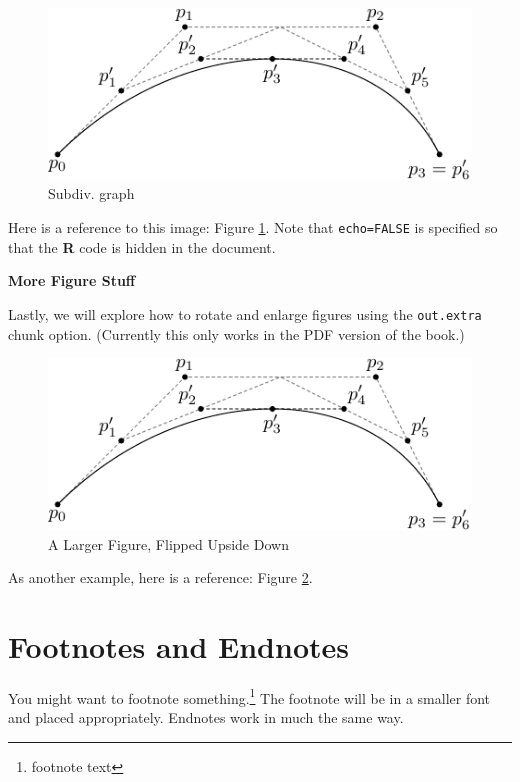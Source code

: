 \documentclass[print]{nuthesis}
\begin{document}
\begin{figure}
\includegraphics[width=\linewidth,scale=0.75]{figure/subdivision} \caption{Subdiv. graph}\label{fig:subd}
\end{figure}

Here is a reference to this image: Figure \ref{fig:subd}. Note that \texttt{echo=FALSE} is specified so that the \textbf{R} code is hidden in the document.

\textbf{More Figure Stuff}

Lastly, we will explore how to rotate and enlarge figures using the \texttt{out.extra} chunk option. (Currently this only works in the PDF version of the book.)

\begin{figure}
\includegraphics[width=\linewidth,angle=180, scale=1.1]{figure/subdivision} \caption{A Larger Figure, Flipped Upside Down}\label{fig:subd2}
\end{figure}

As another example, here is a reference: Figure \ref{fig:subd2}.

\hypertarget{footnotes-and-endnotes}{%
\section{Footnotes and Endnotes}\label{footnotes-and-endnotes}}

You might want to footnote something.\footnote{footnote text} The footnote will be in a smaller font and placed appropriately. Endnotes work in much the same way.
\end{document}
